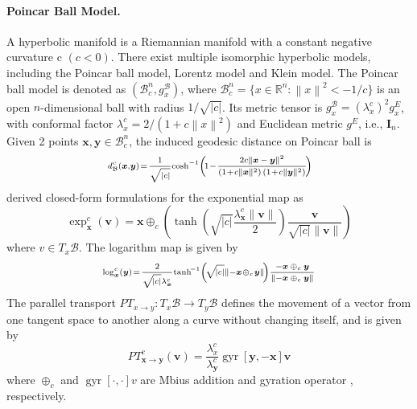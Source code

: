 \documentclass[letterpaper]{article} %
\begin{document}
\paragraph{Poincar Ball Model.}
A hyperbolic manifold is a Riemannian manifold with a constant negative curvature c $(c<0)$. 
There exist multiple isomorphic hyperbolic models, including the Poincar ball model, Lorentz model and Klein model. The Poincar ball model is denoted as $(\mathcal{B}^n_c,g^\mathcal{B}_x)$, where $\mathcal{B}^n_c=\{x\in\mathbb{R}^n:\left \| x \right \|^2<-1/c\}$ is an open $n$-dimensional ball with radius $1/\sqrt{|c|}$. Its metric tensor is $g^\mathcal{B}_x=(\lambda^c_x)^2g^E_x$, with conformal factor $\lambda^c_x=2/(1+c\left \| x \right \|^2)$ and Euclidean metric $g^E$, i.e., $\mathbf{I}_n$. 
Given 2 points $\boldsymbol{x}, \boldsymbol{y}\in \mathcal{B}^n_c$, the induced geodesic distance on Poincar ball is
\begin{equation}
\begin{scriptsize}
d_{\mathcal{B}}^{c}(\boldsymbol{x},\!\boldsymbol{y})\!=\!
\frac{1}{\sqrt{|c|}}\!\cosh ^{-1}\!\left(\!1\!-\!\frac{2 c\|\boldsymbol{x}-\boldsymbol{y}\|^{2}}{\left(1\!+\!c\|\boldsymbol{x}\|^{2}\right)\left(1\!+\!c\|\boldsymbol{y}\|^{2}\right)}\!\right)
\end{scriptsize}\!
\end{equation}
\citet{ganea2018hyperbolic} derived closed-form formulations for the exponential map as
\begin{equation}\label{2}
\exp _{\boldsymbol{x}}^{c}(\boldsymbol{v})=\boldsymbol{x} \oplus_{c}\left(\tanh \left(\sqrt{|c|} \frac{\lambda_{\boldsymbol{x}}^{c}\|\boldsymbol{v}\|}{2}\right) \frac{\boldsymbol{v}}{\sqrt{|c|}\|\boldsymbol{v}\|}\right)
\end{equation}
where $v\in T_x\mathcal{B}$. The logarithm map is given by
\begin{equation}\label{3}
\begin{scriptsize}
\log _{\boldsymbol{x}}^{c}(\boldsymbol{y})\!=\!\frac{2}{\sqrt{\!|c|} \lambda_{\boldsymbol{x}}^{c}}\! \tanh ^{\!-1}\!\left(\!\sqrt{\!|c|}\!\left\|-\boldsymbol{x}\! \oplus_{c}\! \boldsymbol{y}\right\|\!\right)\! \frac{-\boldsymbol{x} \oplus_{c} \boldsymbol{y}}{\left\|-\boldsymbol{x} \oplus_{c} \boldsymbol{y}\right\|}
\end{scriptsize}
\end{equation}
The parallel transport $PT_{x\rightarrow y}:T_x\mathcal{B} \rightarrow T_y\mathcal{B}$
defines the movement of a vector from one tangent space to another along a curve without changing itself, and is given by
\begin{equation}\label{4}
P T_{\mathbf{x} \rightarrow \mathbf{y}}^{c}(\mathbf{v})=\frac{\lambda_{x}^{c}}{\lambda_{\mathbf{y}}^{c}} \operatorname{gyr}[\mathbf{y},-\mathbf{x}] \mathbf{v}
\end{equation}
where $\oplus_{c}$ and $\operatorname{gyr}[\cdot,\cdot]v$ are Mbius addition \cite{ungar2007hyperbolic} and gyration operator \cite{ungar2008gyrovector}, respectively.
\end{document}
